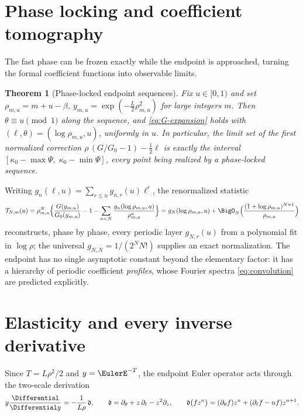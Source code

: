 \documentclass[11pt,oneside]{article}
\numberwithin{equation}{section}
\newtheorem{theorem}{Theorem}[section]
\theoremstyle{definition}
\theoremstyle{remark}
\newcommand{\Gzero}{G_0}
\begin{document}
\section{Phase locking and coefficient tomography}
\label{sec:tomography}

The fast phase can be frozen exactly while the endpoint is
approached, turning the formal coefficient functions into observable
limits.

\begin{theorem}[Phase-locked endpoint sequences]
\label{thm:phase-locked}
Fix $u\in[0,1)$ and set
$\rho_{m,u}=m+u-\beta$,
$y_{m,u}=\exp(-\tfrac L2\rho_{m,u}^{2})$ for large integers $m$.
Then $\theta\equiv u\pmod1$ along the sequence, and
\eqref{eq:G-expansion} holds with
$(\ell,\theta)=(\log\rho_{m,u},u)$, uniformly in $u$.  In
particular, the limit set of the first normalized correction
$\rho\,(G/\Gzero-1)-\tfrac12\ell$ is exactly the interval
$[\kappa_0-\max\Psi,\;\kappa_0-\min\Psi]$, every point being realized
by a phase-locked sequence.
\end{theorem}

Writing $g_n(\ell,u)=\sum_{r\le n}g_{n,r}(u)\ell^{r}$, the
renormalized statistic
\begin{equation}
 \mathcal T_{N,m}(u)
 =\rho_{m,u}^{N}\Bigl\{
 \frac{G(y_{m,u})}{\Gzero(y_{m,u})}-1
 -\sum_{n<N}\frac{g_n(\log\rho_{m,u},u)}{\rho_{m,u}^{n}}
 \Bigr\}
 =g_N(\log\rho_{m,u},u)
 +\BigO_N\Bigl(\frac{(1+\log\rho_{m,u})^{N+1}}{\rho_{m,u}}\Bigr)
 \label{eq:tomography}
\end{equation}
reconstructs, phase by phase, every periodic layer
$g_{N,r}(u)$ from a polynomial fit in $\log\rho$; the universal
$g_{N,N}=1/(2^{N}N!)$ supplies an exact normalization.  The endpoint
has no single asymptotic constant beyond the elementary factor: it
has a hierarchy of periodic coefficient \emph{profiles}, whose
Fourier spectra \eqref{eq:convolution} are predicted explicitly.

\section{Elasticity and every inverse derivative}
\label{sec:derivatives}

Since $T=L\rho^{2}/2$ and $y=\EulerE^{-T}$, the endpoint Euler operator
acts through the two-scale derivation
\begin{equation}
 y\frac{\Differential}{\Differential y}=-\frac1{L\rho}\,\mathfrak d,
 \qquad
 \mathfrak d=\partial_\theta+z\,\partial_\ell-z^{2}\partial_z,
 \qquad
 \mathfrak d\bigl(fz^{n}\bigr)
 =(\partial_\theta f)z^{n}
 +(\partial_\ell f-nf)z^{n+1}.
 \label{eq:two-scale-D}
\end{equation}
\end{document}
